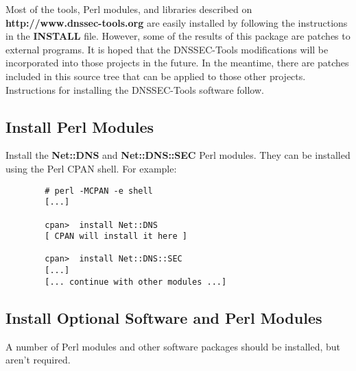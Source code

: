 \documentclass[12pt]{article}
\newcommand{\perlmod}[1]{{\bf #1}}
\newcommand{\path}[1]{{\bf #1}}
\newcommand{\url}[1]{{\bf #1}}
\begin{document}
Most of the tools, Perl modules, and libraries described on
\url{http://www.dnssec-tools.org} are easily installed by following the
instructions in the \path{INSTALL} file.  However, some of the results of
this package are patches to external programs.  It is hoped that the
DNSSEC-Tools modifications will be incorporated into those projects in the
future.  In the meantime, there are patches included in this source tree that
can be applied to those other projects.  Instructions for installing the
DNSSEC-Tools software follow.


\subsection{Install Perl Modules}

Install the \perlmod{Net::DNS} and \perlmod{Net::DNS::SEC} Perl modules.
They can be installed using the Perl CPAN shell.  For example:

\begin{verbatim}
        # perl -MCPAN -e shell
        [...]

        cpan>  install Net::DNS
        [ CPAN will install it here ]

        cpan>  install Net::DNS::SEC
        [...]
        [... continue with other modules ...]
\end{verbatim}


\subsection{Install Optional Software and Perl Modules}

A number of Perl modules and other software packages should be installed, but
aren't required.
\end{document}
